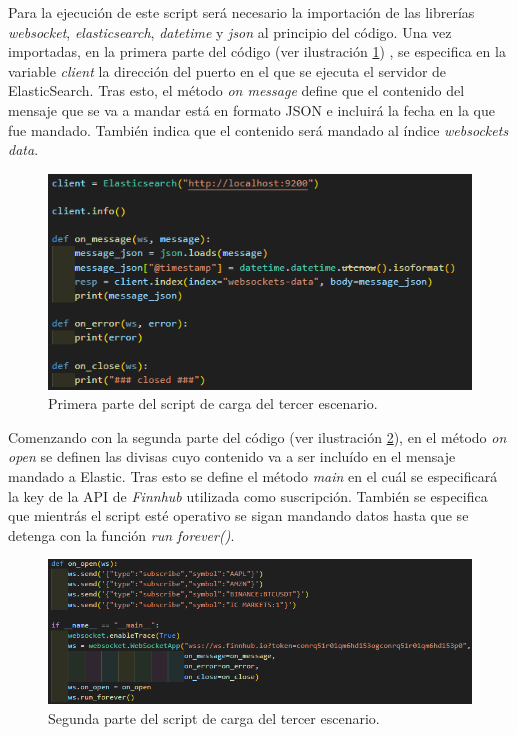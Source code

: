 Para la ejecución de este script será necesario la importación de las librerías \textit{websocket}, \textit{elasticsearch}, \textit{datetime} y \textit{json} al principio del código. Una vez importadas, en la primera parte del código (ver ilustración \ref{fig:escenario31}) , se especifica en la variable \textit{client} la dirección del puerto en el que se ejecuta el servidor de ElasticSearch. Tras esto, el método \textit{on message} define que el contenido del mensaje que se va a mandar está en formato JSON e incluirá la fecha en la que fue mandado. También indica que el contenido será mandado al índice \textit{websockets data}.
\begin{figure}
    \centering
    \includegraphics[width=1\linewidth]{img/escenario31.png}
    \caption{Primera parte del script de carga del tercer escenario.}
    \label{fig:escenario31}
\end{figure}

Comenzando con la segunda parte del código  (ver ilustración  \ref{fig:escenario32}), en el método \textit{on open} se definen las divisas cuyo contenido va a ser incluído en el mensaje mandado a Elastic. Tras esto se define el método \textit{main} en el cuál se especificará la key de la API de \textit{Finnhub} utilizada como suscripción. También se especifica que mientrás el script esté operativo se sigan mandando datos hasta que se detenga con la función \textit{run forever()}.
\begin{figure}
    \centering
    \includegraphics[width=1\linewidth]{img/escenario32.png}
    \caption{Segunda parte del script de carga del tercer escenario.}
    \label{fig:escenario32}
\end{figure}

